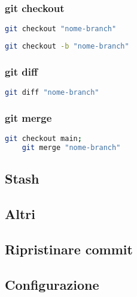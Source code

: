 \subsubsection{git checkout}
\begin{lstlisting}[language=bash]
	git checkout "nome-branch" 
\end{lstlisting}
\begin{lstlisting}[language=bash]
	git checkout -b "nome-branch" 
\end{lstlisting}

\subsubsection{git diff}
\begin{lstlisting}[language=bash]
	git diff "nome-branch" 
\end{lstlisting}

\subsubsection{git merge}
\begin{lstlisting}[language=bash]
	git checkout main;
	git merge "nome-branch"
\end{lstlisting}




\subsection{Stash}



\subsection{Altri}


\subsection{Ripristinare commit}

\subsection{Configurazione}


